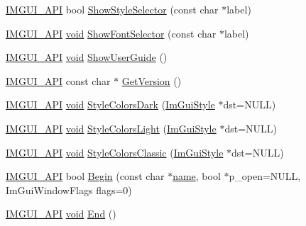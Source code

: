 \begin{DoxyCompactItemize}
\item 
\hyperlink{imgui_8h_a43829975e84e45d1149597467a14bbf5}{I\+M\+G\+U\+I\+\_\+\+A\+PI} bool \hyperlink{namespaceImGui_a3bd72fcc7bc17555a0db9fbb0819ec3b}{Show\+Style\+Selector} (const char $\ast$label)
\item 
\hyperlink{imgui_8h_a43829975e84e45d1149597467a14bbf5}{I\+M\+G\+U\+I\+\_\+\+A\+PI} \hyperlink{imgui__impl__opengl3__loader_8h_ac668e7cffd9e2e9cfee428b9b2f34fa7}{void} \hyperlink{namespaceImGui_aa6155d6de1832264651b70631309bc09}{Show\+Font\+Selector} (const char $\ast$label)
\item 
\hyperlink{imgui_8h_a43829975e84e45d1149597467a14bbf5}{I\+M\+G\+U\+I\+\_\+\+A\+PI} \hyperlink{imgui__impl__opengl3__loader_8h_ac668e7cffd9e2e9cfee428b9b2f34fa7}{void} \hyperlink{namespaceImGui_a0fc3a48a4efc3dfea9eb263b2cf4d4a2}{Show\+User\+Guide} ()
\item 
\hyperlink{imgui_8h_a43829975e84e45d1149597467a14bbf5}{I\+M\+G\+U\+I\+\_\+\+A\+PI} const char $\ast$ \hyperlink{namespaceImGui_a6488c3cfa6331c8a1e93769e580ce020}{Get\+Version} ()
\item 
\hyperlink{imgui_8h_a43829975e84e45d1149597467a14bbf5}{I\+M\+G\+U\+I\+\_\+\+A\+PI} \hyperlink{imgui__impl__opengl3__loader_8h_ac668e7cffd9e2e9cfee428b9b2f34fa7}{void} \hyperlink{namespaceImGui_a26c67fc14081b359566d5e135cd8c767}{Style\+Colors\+Dark} (\hyperlink{structImGuiStyle}{Im\+Gui\+Style} $\ast$dst=N\+U\+LL)
\item 
\hyperlink{imgui_8h_a43829975e84e45d1149597467a14bbf5}{I\+M\+G\+U\+I\+\_\+\+A\+PI} \hyperlink{imgui__impl__opengl3__loader_8h_ac668e7cffd9e2e9cfee428b9b2f34fa7}{void} \hyperlink{namespaceImGui_ae1fc558bfbc557b228d63f7facfc86e1}{Style\+Colors\+Light} (\hyperlink{structImGuiStyle}{Im\+Gui\+Style} $\ast$dst=N\+U\+LL)
\item 
\hyperlink{imgui_8h_a43829975e84e45d1149597467a14bbf5}{I\+M\+G\+U\+I\+\_\+\+A\+PI} \hyperlink{imgui__impl__opengl3__loader_8h_ac668e7cffd9e2e9cfee428b9b2f34fa7}{void} \hyperlink{namespaceImGui_a1cf931a42a10f71150def3ce222434b6}{Style\+Colors\+Classic} (\hyperlink{structImGuiStyle}{Im\+Gui\+Style} $\ast$dst=N\+U\+LL)
\item 
\hyperlink{imgui_8h_a43829975e84e45d1149597467a14bbf5}{I\+M\+G\+U\+I\+\_\+\+A\+PI} bool \hyperlink{namespaceImGui_a581e58db0bc930bafa4a5d23093a2b99}{Begin} (const char $\ast$\hyperlink{imgui__impl__opengl3__loader_8h_a5c4947d4516dd7cfa3505ce3a648a4ef}{name}, bool $\ast$p\+\_\+open=N\+U\+LL, Im\+Gui\+Window\+Flags flags=0)
\item 
\hyperlink{imgui_8h_a43829975e84e45d1149597467a14bbf5}{I\+M\+G\+U\+I\+\_\+\+A\+PI} \hyperlink{imgui__impl__opengl3__loader_8h_ac668e7cffd9e2e9cfee428b9b2f34fa7}{void} \hyperlink{namespaceImGui_a5479d93794a004c67ceb6d13f37c8254}{End} ()

\end{DoxyCompactItemize}
